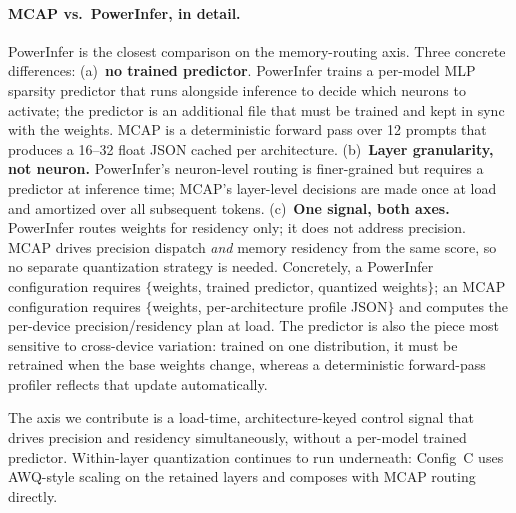 \documentclass{article}
\begin{document}
\paragraph{MCAP vs.\ PowerInfer, in detail.} PowerInfer is the closest
comparison on the memory-routing axis. Three concrete differences: (a)~\textbf{no
trained predictor}. PowerInfer trains a per-model MLP sparsity predictor that
runs alongside inference to decide which neurons to activate; the predictor is
an additional file that must be trained and kept in sync with the weights. MCAP
is a deterministic forward pass over 12 prompts that produces a 16--32 float
JSON cached per architecture. (b)~\textbf{Layer granularity, not neuron.}
PowerInfer's neuron-level routing is finer-grained but requires a predictor at
inference time; MCAP's layer-level decisions are made once at load and amortized
over all subsequent tokens. (c)~\textbf{One signal, both axes.} PowerInfer
routes weights for residency only; it does not address precision. MCAP drives
precision dispatch \emph{and} memory residency from the same score, so no
separate quantization strategy is needed. Concretely, a PowerInfer configuration
requires $\{$weights, trained predictor, quantized weights$\}$; an MCAP
configuration requires $\{$weights, per-architecture profile JSON$\}$ and
computes the per-device precision/residency plan at load. The predictor is also
the piece most sensitive to cross-device variation: trained on one distribution,
it must be retrained when the base weights change, whereas a deterministic
forward-pass profiler reflects that update automatically.

The axis we contribute is a load-time, architecture-keyed control signal
that drives precision and residency simultaneously, without a per-model
trained predictor. Within-layer quantization continues to run underneath:
Config~C uses AWQ-style scaling on the retained layers and composes with
MCAP routing directly.
\end{document}
